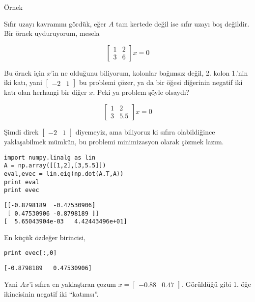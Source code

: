\documentclass[12pt,fleqn]{article}\usepackage{../../common}
\begin{document}
Örnek

Sıfır uzayı kavramını gördük, eğer $A$ tam kertede değil ise sıfır uzayı boş
değildir. Bir örnek uyduruyorum, mesela

$$
\left[\begin{array}{rrr} 1 & 2 \\ 3 & 6 \end{array}\right] x = 0
$$

Bu örnek için $x$'in ne olduğunu biliyorum, kolonlar bağımsız değil, 2. kolon
1.'nin iki katı, yani $\left[\begin{array}{cc} -2 & 1 \end{array}\right]$ bu
problemi çözer, ya da bir öğesi diğerinin negatif iki katı olan herhangi bir
diğer $x$. Peki ya problem şöyle olsaydı?

$$
\left[\begin{array}{cc} 1 & 2 \\ 3 & 5.5 \end{array}\right] x = 0
$$

Şimdi direk $\left[\begin{array}{cc} -2 & 1 \end{array}\right]$ diyemeyiz, ama
biliyoruz ki sıfıra olabildiğince yaklaşabilmek mümkün, bu problemi minimizasyon
olarak çözmek lazım.

\begin{verbatim}
import numpy.linalg as lin
A = np.array([[1,2],[3,5.5]])
eval,evec = lin.eig(np.dot(A.T,A))
print eval
print evec
\end{verbatim}

\begin{verbatim}
[[-0.8798189  -0.47530906]
 [ 0.47530906 -0.8798189 ]]
[  5.65043904e-03   4.42443496e+01]
\end{verbatim}

En küçük özdeğer birincisi,

\begin{verbatim}
print evec[:,0]
\end{verbatim}

\begin{verbatim}
[-0.8798189   0.47530906]
\end{verbatim}

Yani $Ax$'i sıfıra en yaklaştıran çozum $x = \left[\begin{array}{cc} -0.88 &
 0.47 \end{array}\right]$. Görüldüğü gibi 1. öğe ikincisinin negatif iki
``katımsı''. 
\end{document}
